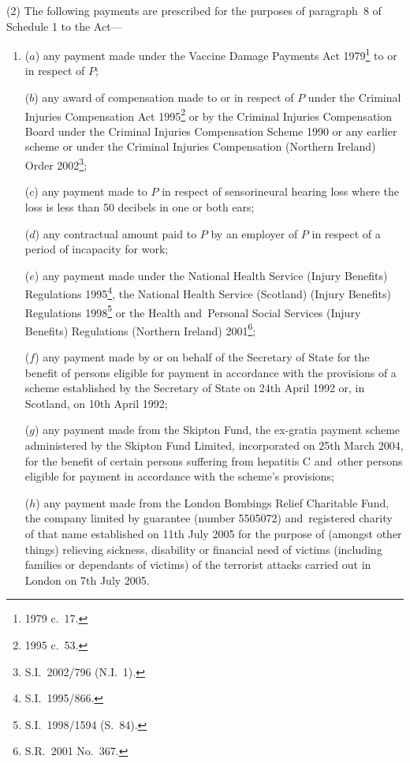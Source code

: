 \documentclass[12pt,a4paper]{article}
\begin{document}
(2) The following payments are prescribed for the purposes of paragraph~8 of Schedule 1 to the Act—
\begin{enumerate}\item[]
($a$) any payment made under the Vaccine Damage Payments Act 1979\footnote{1979 c.~17.} to or in respect of $P$;

($b$) any award of compensation made to or in respect of $P$ under the Criminal Injuries Compensation Act 1995\footnote{1995 c.~53.} or by the Criminal Injuries Compensation Board under the Criminal Injuries Compensation Scheme 1990 or any earlier scheme or under the Criminal Injuries Compensation (Northern Ireland) Order 2002\footnote{S.I.~2002/796 (N.I.~1).};

($c$) any payment made to $P$ in respect of sensorineural hearing loss where the loss is less than 50 decibels in one or both ears;

($d$) any contractual amount paid to $P$ by an employer of $P$ in respect of a period of incapacity for work;

($e$) any payment made under the National Health Service (Injury Benefits) Regulations 1995\footnote{S.I.~1995/866.}, the National Health Service (Scotland) (Injury Benefits) Regulations 1998\footnote{S.I.~1998/1594 (S.~84).} or the Health and~Personal Social Services (Injury Benefits) Regulations (Northern Ireland) 2001\footnote{S.R.~2001 No.~367.};

($f$) any payment made by or on behalf of the Secretary of State for the benefit of persons eligible for payment in accordance with the provisions of a scheme established by the Secretary of State on 24th April 1992 or, in Scotland, on 10th April 1992;

($g$) any payment made from the Skipton Fund, the ex-gratia payment scheme administered by the Skipton Fund Limited, incorporated on 25th March 2004, for the benefit of certain persons suffering from hepatitis C and~other persons eligible for payment in accordance with the scheme’s provisions;

($h$) any payment made from the London Bombings Relief Charitable Fund, the company limited by guarantee (number 5505072) and~registered charity of that name established on 11th July 2005 for the purpose of (amongst other things) relieving sickness, disability or financial need of victims (including families or dependants of victims) of the terrorist attacks carried out in London on 7th July 2005.
\end{enumerate}
\end{document}
